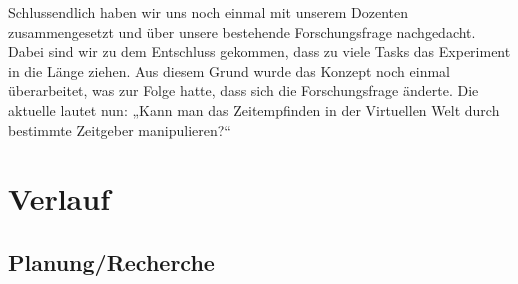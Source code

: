 \documentclass{Bericht}
\begin{document}
	Schlussendlich haben wir uns noch einmal mit unserem Dozenten zusammengesetzt und über unsere bestehende Forschungsfrage nachgedacht. Dabei sind wir zu dem Entschluss gekommen, dass zu viele Tasks das Experiment in die Länge ziehen. Aus diesem Grund wurde das Konzept noch einmal überarbeitet, was zur Folge hatte, dass sich die Forschungsfrage änderte. Die aktuelle lautet nun: „Kann man das Zeitempfinden in der Virtuellen Welt durch bestimmte Zeitgeber manipulieren?“
\section{Verlauf} %
	\subsection{Planung/Recherche} %
	
\end{document}
